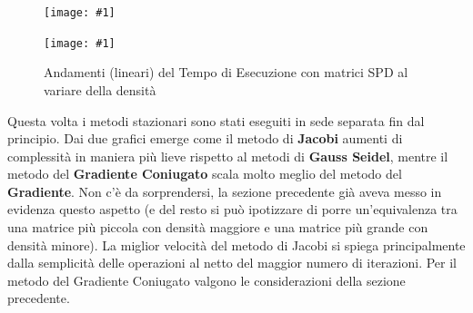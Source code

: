 \documentclass[a4paper,11pt,oneside, table]{article}
\newcommand{\putsubimage}[5] {
  \begin{minipage}{{#4}\linewidth}
	    \centering
      \texttt{[image: \#1]}
	    \caption{#2}\label{#3}
	\end{minipage}
}
\newcommand{\putimagecouple}[2] {
  \begin{figure}[!htb]
      \centering
      #1
      \hspace{0.5cm}
      #2
  \end{figure}
}
\begin{document}
\putimagecouple
  {\putsubimage{./images/001-sparsity-density-elapsed.png}{Andamenti (lineari) del Tempo di Esecuzione con matrici RDD al variare della densit\`a}{png:001-sparsity-density-elapsed}{0.4}{0.99}}
  {\putsubimage{./images/002-sparsity-density-elapsed.png}{Andamenti (lineari) del Tempo di Esecuzione con matrici SPD al variare della densit\`a}{png:002-sparsity-density-elapsed}{0.4}{0.99}}

Questa volta i metodi stazionari sono stati eseguiti in sede separata fin dal principio.
Dai due grafici emerge come il metodo di \textbf{Jacobi} aumenti di complessit\`a in maniera pi\`u lieve rispetto al metodi di \textbf{Gauss Seidel}, mentre il metodo del \textbf{Gradiente Coniugato} scala molto meglio del metodo del \textbf{Gradiente}.
Non c'\`e da sorprendersi, la sezione precedente gi\`a aveva messo in evidenza questo aspetto (e del resto si pu\`o ipotizzare di porre un'equivalenza tra una matrice pi\`u piccola con densit\`a maggiore e una matrice pi\`u grande con densit\`a minore).
La miglior velocit\`a del metodo di Jacobi si spiega principalmente dalla semplicit\`a delle operazioni al netto del maggior numero di iterazioni.
Per il metodo del Gradiente Coniugato valgono le considerazioni della sezione precedente.

\printbibliography[title={Bibliografia}]
\end{document}
